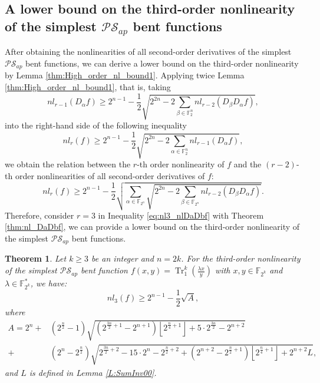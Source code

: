 \documentclass{article}
\newcommand{\F}{\mathbb{F}}
\newcommand{\0}{\textbf{0}}
\newcommand{\1}{\textbf{1}}
\newcommand{\TRACE}{\operatorname{Tr}_1^k}
\theoremstyle{plain}
\newtheorem{theorem}{Theorem}
\begin{document}
\subsection{A lower bound on the third-order nonlinearity of the simplest $\mathcal{PS}_{ap}$ bent functions}
    After obtaining the nonlinearities of all second-order derivatives of the simplest $\mathcal{PS}_{ap}$ bent functions, we can derive a lower bound on the third-order nonlinearity by Lemma \ref{thm:High_order_nl_bound1}.
    Applying twice Lemma \ref{thm:High_order_nl_bound1}, that is, taking
    \[nl_{r-1}(D_{\alpha}f) \ge 2^{n-1}-\frac{1}{2}\sqrt{2^{2n}-2\sum_{\beta\in\F_2^n}nl_{r-2}(D_{\beta}D_{\alpha}f)},\]
    into the right-hand side of the following inequality
    \[nl_r(f) \ge 2^{n-1}-\frac{1}{2}\sqrt{2^{2n}-2\sum_{\alpha\in\F_2^n}nl_{r-1}(D_{\alpha}f)},\]
    we obtain the relation between the $r$-th order nonlinearity of $f$ and the $(r-2)$-th order nonlinearities of all second-order derivatives of $f$:
    \begin{equation}\label{eq:nl3_nlDaDbf}
        nl_r(f)\ge 2^{n-1}-\frac{1}{2}\sqrt{\sum_{\alpha\in\F_{2^n}}\sqrt{2^{2n}-2\sum_{\beta\in\F_{2^n}} nl_{r-2}(D_{\beta}D_{\alpha}f)}}.
    \end{equation}
    Therefore, consider $r=3$ in Inequality \eqref{eq:nl3_nlDaDbf} with Theorem \ref{thm:nl_DaDbf}, we can provide a lower bound on the third-order nonlinearity of the simplest $\mathcal{PS}_{ap}$ bent functions.
    \begin{theorem}\label{th:our_lower_bound}
        Let $k\ge 3$ be an integer and $n=2k$. For the third-order nonlinearity of the simplest $\mathcal{PS}_{ap}$ bent function $f(x,y)=\TRACE(\frac{\lambda x}{y})$ with $x,y\in\F_{2^k}$ and $\lambda\in\F_{2^k}^*$, we have:
        \[nl_3(f)\ge 2^{n-1}-\frac{1}{2}\sqrt{A},\]
        where
        \begin{align*}
            A=2^n+&(2^{\frac{n}{2}}-1)\sqrt{(2^{\frac{3n}{2}+1}-2^{n+1})\left\lfloor 2^{\frac{n}{4}+1}\right\rfloor+5\cdot 2^{\frac{3n}{2}}-2^{n+2}}\\
            +&(2^n-2^{\frac{n}{2}})\sqrt{2^{\frac{3n}{2}+2}-15\cdot 2^n-2^{\frac{n}{2}+2}+(2^{n+2}-2^{\frac{n}{2}+1})\left\lfloor 2^{\frac{n}{4}+1}\right\rfloor+2^{n+2}L},
        \end{align*}
        and $L$ is defined in Lemma \ref{L:SumInv00}.
    \end{theorem}
\end{document}

